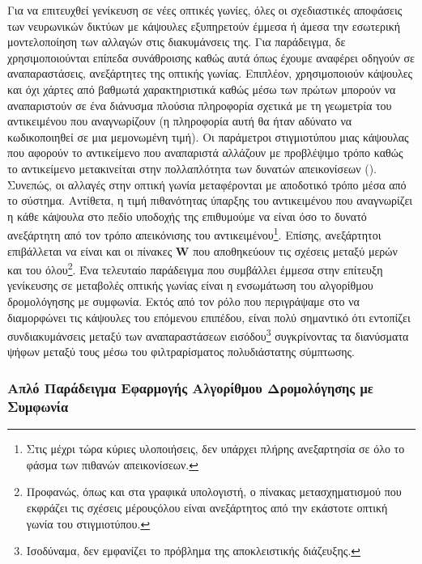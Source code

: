 Για να επιτευχθεί γενίκευση σε νέες οπτικές γωνίες, όλες οι σχεδιαστικές αποφάσεις των νευρωνικών δικτύων με κάψουλες εξυπηρετούν έμμεσα ή άμεσα την εσωτερική μοντελοποίηση των αλλαγών στις διακυμάνσεις της. Για παράδειγμα, δε χρησιμοποιούνται επίπεδα συνάθροισης καθώς αυτά όπως έχουμε αναφέρει οδηγούν σε αναπαραστάσεις, ανεξάρτητες της οπτικής γωνίας. Επιπλέον, χρησιμοποιούν κάψουλες και όχι χάρτες από βαθμωτά χαρακτηριστικά καθώς μέσω των πρώτων μπορούν να αναπαριστούν σε ένα διάνυσμα πλούσια πληροφορία σχετικά με τη γεωμετρία του αντικειμένου που αναγνωρίζουν (η πληροφορία αυτή θα ήταν αδύνατο να κωδικοποιηθεί σε μια μεμονωμένη τιμή). Οι παράμετροι στιγμιοτύπου μιας κάψουλας που αφορούν το αντικείμενο που αναπαριστά αλλάζουν με προβλέψιμο τρόπο καθώς το αντικείμενο μετακινείται στην πολλαπλότητα των δυνατών απεικονίσεων (). Συνεπώς, οι αλλαγές στην οπτική γωνία μεταφέρονται με αποδοτικό τρόπο μέσα από το σύστημα. Αντίθετα, η τιμή πιθανότητας ύπαρξης του αντικειμένου που αναγνωρίζει η κάθε κάψουλα στο πεδίο υποδοχής της επιθυμούμε να είναι όσο το δυνατό ανεξάρτητη από τον τρόπο απεικόνισης του αντικειμένου\footnote{Στις μέχρι τώρα κύριες υλοποιήσεις, δεν υπάρχει πλήρης ανεξαρτησία σε όλο το φάσμα των πιθανών απεικονίσεων.}. Επίσης, ανεξάρτητοι επιβάλλεται να είναι και οι πίνακες $\boldsymbol{W}$ που αποθηκεύουν τις σχέσεις μεταξύ μερών και του όλου\footnote{Προφανώς, όπως και στα γραφικά υπολογιστή, ο πίνακας μετασχηματισμού που εκφράζει τις σχέσεις μέρους\textendash όλου είναι ανεξάρτητος από την εκάστοτε οπτική γωνία του στιγμιοτύπου.}. Ένα τελευταίο παράδειγμα που συμβάλλει έμμεσα στην επίτευξη γενίκευσης σε μεταβολές οπτικής γωνίας είναι η ενσωμάτωση του αλγορίθμου δρομολόγησης με συμφωνία. Εκτός από τον ρόλο που περιγράψαμε στο να διαμορφώνει τις κάψουλες του επόμενου επιπέδου, είναι πολύ σημαντικό ότι εντοπίζει συνδιακυμάνσεις μεταξύ των αναπαραστάσεων εισόδου\footnote{Ισοδύναμα, δεν εμφανίζει το πρόβλημα της αποκλειστικής διάζευξης.} συγκρίνοντας τα διανύσματα ψήφων μεταξύ τους μέσω του φιλτραρίσματος πολυδιάστατης σύμπτωσης.

\subsubsection{Απλό Παράδειγμα Εφαρμογής Αλγορίθμου Δρομολόγησης με Συμφωνία}


